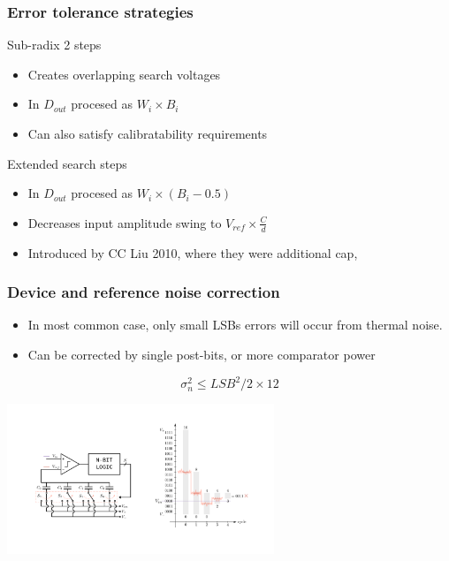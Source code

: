 \documentclass[aspectratio=169]{beamer}
\begin{document}
\begin{frame}
  \frametitle{Error tolerance strategies}
  Sub-radix 2 steps
  \begin{itemize}
    \item Creates overlapping search voltages
    \item In $D_{out}$ procesed as $W_i \times B_i$
    \item Can also satisfy calibratability requirements
  \end{itemize}
  Extended search steps
  \begin{itemize}
    \item In $D_{out}$ procesed as $W_i \times (B_i-0.5)$
    \item Decreases input amplitude swing to $V_{ref} \times \frac{C}{d}$
    \item Introduced by CC Liu 2010, where they were additional cap, 
  \end{itemize}
  \end{frame}

\begin{frame}
\frametitle{Device and reference noise correction}
\begin{itemize}
  \item In most common case, only small LSBs errors will occur from thermal noise.
  \item Can be corrected by single post-bits, or more comparator power
\end{itemize}
\begin{equation*}
\sigma_n^2 \leq LSB^2 / 2 \times 12
\end{equation*}
\begin{center}
\includegraphics[width=0.6\textwidth]{tranchar3.pdf}
\end{center}
\end{frame}
\end{document}

